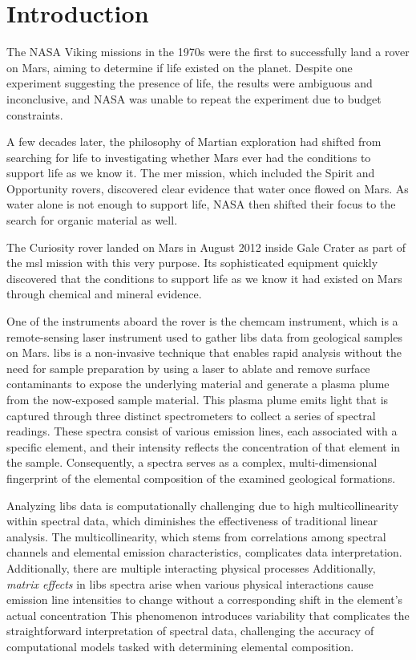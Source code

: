 \section{Introduction}\label{sec:introduction}
The NASA Viking missions in the 1970s were the first to successfully land a rover on Mars, aiming to determine if life existed on the planet.
Despite one experiment suggesting the presence of life, the results were ambiguous and inconclusive, and NASA was unable to repeat the experiment due to budget constraints\cite{marsnasagov_vikings}.

A few decades later, the philosophy of Martian exploration had shifted from searching for life to investigating whether Mars ever had the conditions to support life as we know it.
The \gls{mer} mission, which included the Spirit and Opportunity rovers, discovered clear evidence that water once flowed on Mars.
As water alone is not enough to support life, NASA then shifted their focus to the search for organic material as well\cite{marsnasagov_observer, marsnasagov_spirit_opportunity}.

The Curiosity rover landed on Mars in August 2012 inside Gale Crater as part of the \gls{msl} mission with this very purpose.
Its sophisticated equipment quickly discovered that the conditions to support life as we know it had existed on Mars through chemical and mineral evidence.\cite{marsnasagov_chemcam}

One of the instruments aboard the rover is the \gls{chemcam} instrument, which is a remote-sensing laser instrument used to gather \gls{libs} data from geological samples on Mars.
\gls{libs} is a non-invasive technique that enables rapid analysis without the need for sample preparation by using a laser to ablate and remove surface contaminants to expose the underlying material and generate a plasma plume from the now-exposed sample material.
This plasma plume emits light that is captured through three distinct spectrometers to collect a series of spectral readings.
These spectra consist of various emission lines, each associated with a specific element, and their intensity reflects the concentration of that element in the sample.
Consequently, a spectra serves as a complex, multi-dimensional fingerprint of the elemental composition of the examined geological formations.\cite{cleggRecalibrationMarsScience2017}

Analyzing \gls{libs} data is computationally challenging due to high multicollinearity within spectral data, which diminishes the effectiveness of traditional linear analysis.
The multicollinearity, which stems from correlations among spectral channels and elemental emission characteristics, complicates data interpretation.
Additionally, there are multiple interacting physical processes
Additionally, \textit{matrix effects} in \gls{libs} spectra arise when various physical interactions cause emission line intensities to change without a corresponding shift in the element's actual concentration
This phenomenon introduces variability that complicates the straightforward interpretation of spectral data, challenging the accuracy of computational models tasked with determining elemental composition.\cite{andersonImprovedAccuracyQuantitative2017}


